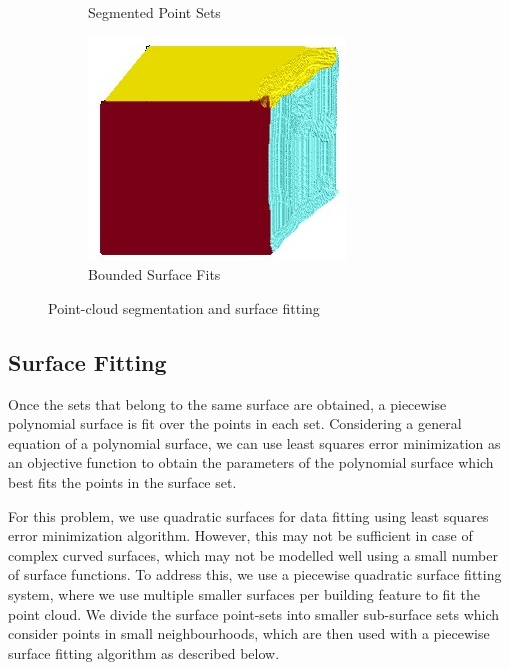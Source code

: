 \documentclass[12pt,a4paper]{article}
\begin{document}
\begin{figure}
\begin{subfigure}[b]{0.23\textwidth}
            \caption{Segmented Point Sets}
            \label{fig:psets}
        \end{subfigure}%
        \quad \quad
        \begin{subfigure}[b]{0.23\textwidth}
            \centering
            \includegraphics[width=\textwidth]{planes.jpg}
            \caption{Bounded Surface Fits}
            \label{fig:planes}
        \end{subfigure}%
        
        \caption{Point-cloud segmentation and surface fitting}
    \end{figure}
    
    
    \subsection{Surface Fitting}
    
    Once the sets that belong to the same surface are obtained, a piecewise polynomial surface is fit over the points in each set. Considering a general equation of a polynomial surface, we can use least squares error minimization as an objective function to obtain the parameters of the polynomial surface which best fits the points in the surface set.
    
    For this problem, we use quadratic surfaces for data fitting using least squares error minimization algorithm. However, this may not be sufficient in case of complex curved surfaces, which may not be modelled well using a small number of surface functions. To address this, we use a piecewise quadratic surface fitting system, where we use multiple smaller surfaces per building feature to fit the point cloud. We divide the surface point-sets into smaller sub-surface sets which consider points in small neighbourhoods, which are then used with a piecewise surface fitting algorithm as described below.
    
\end{document}
